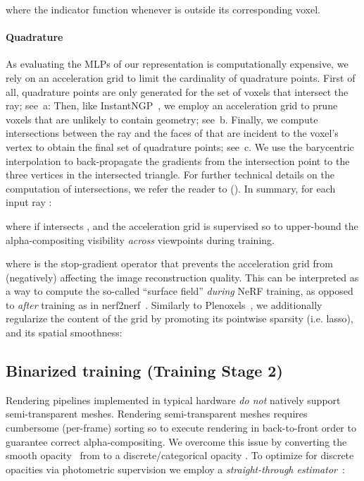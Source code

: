 where the indicator function  whenever  is outside its corresponding voxel.


\paragraph{Quadrature}
As evaluating the MLPs of our representation is computationally expensive, we rely on an acceleration grid to limit the cardinality  of quadrature points.
First of all, quadrature points are only generated for the set of voxels that intersect the ray; see~a:
Then, like InstantNGP~\cite{mueller2022instant}, we employ an acceleration grid  to prune voxels that are unlikely to contain geometry; see~b.
Finally, we compute intersections between the ray and the faces of  that are incident to the voxel's vertex to obtain the final set of quadrature points; see~c.
We use the barycentric interpolation to back-propagate the gradients from the intersection point to the three vertices in the intersected triangle.
For further technical details on the computation of intersections, we refer the reader to \SupplementaryMaterial ().
In summary, for each input ray :

where  if  intersects , and the acceleration grid is supervised so to upper-bound\upperboundfootnote{} the alpha-compositing visibility  \textit{across} viewpoints during training.

where  is the stop-gradient operator that prevents the acceleration grid from (negatively) affecting the image reconstruction quality.
This can be interpreted as a way to compute the so-called ``surface field'' \textit{during} NeRF training, as opposed to \textit{after} training as in nerf2nerf~\cite{nerf2nerf}.
Similarly to Plenoxels~\cite{plenoxels}, we additionally regularize the content of the grid by promoting its pointwise sparsity (i.e. lasso), and its spatial smoothness:




\subsection{Binarized training (Training Stage 2)}
\label{sec:stage2}
Rendering pipelines implemented in typical hardware \textit{do not} natively support semi-transparent meshes. Rendering semi-transparent meshes requires cumbersome (per-frame) sorting so to execute rendering in back-to-front order to guarantee correct alpha-compositing.
We overcome this issue by converting the smooth opacity~ from  to a discrete/categorical opacity .
To optimize for discrete opacities via photometric supervision we employ a \textit{straight-through estimator}~\cite{straightthrough}:

